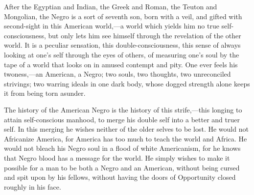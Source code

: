 After the Egyptian and Indian, the Greek and Roman, the Teuton and
Mongolian, the Negro is a sort of seventh son, born with a veil, and
gifted with second-sight in this American world,---a world which
yields him no true self-consciousness, but only lets him see himself
through the revelation of the other world. It is a peculiar sensation,
this double-consciousness, this sense of always looking at one's self
through the eyes of others, of measuring one's soul by the tape of a
world that looks on in amused contempt and pity. One ever feels his
twoness,---an American, a Negro; two souls, two thoughts, two
unreconciled strivings; two warring ideals in one dark body, whose
dogged strength alone keeps it from being torn asunder.

The history of the American Negro is the history of this
strife,---this longing to attain self-conscious manhood, to merge his
double self into a better and truer self. In this merging he wishes
neither of the older selves to be lost. He would not Africanize
America, for America has too much to teach the world and Africa. He
would not bleach his Negro soul in a flood of white Americanism, for
he knows that Negro blood has a message for the world. He simply
wishes to make it possible for a man to be both a Negro and an
American, without being cursed and spit upon by his fellows, without
having the doors of Opportunity closed roughly in his face.


